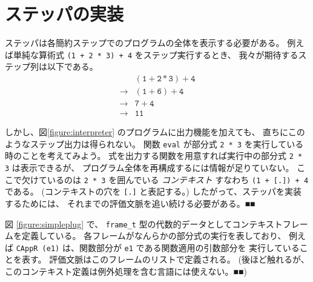 \section{ステッパの実装}
\label{section:try-with__stepper}

ステッパは各簡約ステップでのプログラムの全体を表示する必要がある。
例えば単純な算術式 \texttt{(1 + 2 * 3) + 4} をステップ実行するとき、
我々が期待するステップ列は以下である。
\[
\begin{array}{cl}
            & \mathtt{(1 + 2 * 3) + 4} \\
\rightarrow & \mathtt{(1 + 6) + 4} \\
\rightarrow & \mathtt{7 + 4} \\
\rightarrow & \mathtt{11}
\end{array}
\]

しかし、図\ref{figure:interpreter} のプログラムに出力機能を加えても、
直ちにこのようなステップ出力は得られない。
関数 \texttt{eval} が部分式 \texttt{2 * 3} を実行している時のことを考えてみよう。
式を出力する関数を用意すれば実行中の部分式 \texttt{2 * 3} は表示できるが、
プログラム全体を再構成するには情報が足りていない。
ここで欠けているのは \texttt{2 * 3} を囲んでいる \emph{コンテキスト} すなわち
\texttt{(1 + [.])\ + 4} である。
(コンテキストの穴を \texttt{[.]} と表記する。)
したがって、ステッパを実装するためには、
それまでの評価文脈を追い続ける必要がある。■■

図 \ref{figure:simpleplug} で、 \texttt{frame\_t} 型の代数的データとしてコンテキストフレームを定義している。
各フレームがなんらかの部分式の実行を表しており、
例えば \texttt{CAppR (e1)} は、関数部分が \texttt{e1} である関数適用の引数部分を
実行していることを表す。
評価文脈はこのフレームのリストで定義される。
(後ほど触れるが、このコンテキスト定義は例外処理を含む言語には使えない。■■)

